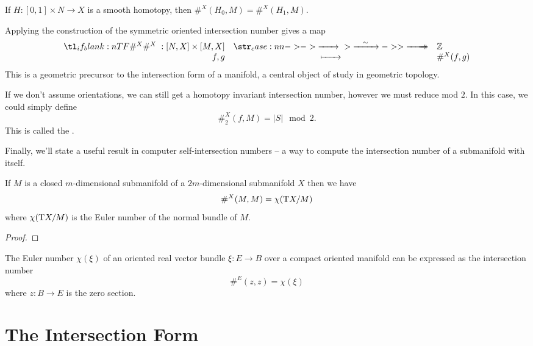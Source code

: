 \begin{corollary}
	If $H : [0,1]\times N \to X$ is a smooth homotopy, then $\#^X(H_0, M) = \#^X(H_1, M)$.
\end{corollary}

Applying the construction of the symmetric oriented intersection number gives a map
\begin{equation}\label{eq:oriented-intersection-number-homotopy}
	\lkxfunc{\#^X}{[N,X]\times [M,X]}{\Z}{f,g}{\#^X(f,g)}
\end{equation}
This is a geometric precursor to the intersection form of a manifold, a central object of study in geometric topology.

\begin{remark}
	If we don't assume orientations, we can still get a homotopy invariant intersection number, however we must reduce mod $2$. In this case, we could simply define
	\[
		\#_2^X(f,M) = |S|\mod 2.
	\]
	This is called the .
\end{remark}

Finally, we'll state a useful result in computer self-intersection numbers -- a way to compute the intersection number of a submanifold with itself.

\begin{theorem}\label{thm:euler-number-self-intersection}
	If $M$ is a closed $m$-dimensional submanifold of a $2m$-dimensional submanifold $X$ then we have
	\[
		\#^X(M, M) = \chi(\mathrm{T} X/M)
	\]
	where $\chi(\mathrm{T} X/M)$ is the Euler number of the normal bundle of $M$.
\end{theorem}
\begin{proof}
\end{proof}

\begin{corollary}\label{thm:euler-number-self-intersection-corollary}
	The Euler number $\chi(\xi)$ of an oriented real vector bundle $\xi : E \to B$ over a compact oriented manifold can be expressed as the intersection number
	\[
		\#^E(z,z) = \chi(\xi)
	\]
	where $z : B \to E$ is the zero section.
\end{corollary}


\pagebreak
\section{The Intersection Form}\label{sec:intersection-form}

